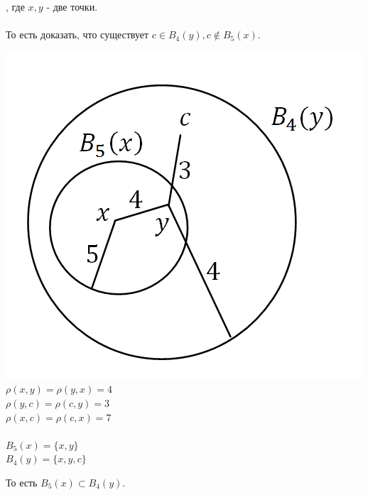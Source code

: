 , где $x, y$ - две точки. \\ \\То есть доказать, что существует $c\in B_4(y), c\notin B_5(x)$.\begin{center}
    \includegraphics[scale=0.5]{l4_5.png}\\
    $\rho (x, y) = \rho(y, x) = 4$\\
    $\rho (y, c) = \rho(c, y) = 3$\\
    $\rho (x, c) = \rho(c, x) = 7$\\
    ~\\
    $B_5(x) = \{ x, y \}$\\
    $B_4(y) = \{x, y, c \} $\end{center}
То есть $B_5(x) \subset B_4(y)$.\\

